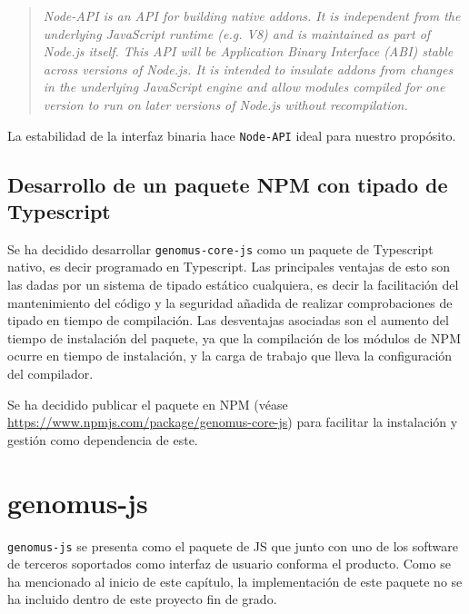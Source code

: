 \begin{quote} \textit{
    Node-API is an API for building native addons. It is independent from the underlying JavaScript runtime (e.g. V8) and is maintained as part of Node.js itself. This API will be Application Binary Interface (ABI) stable across versions of Node.js. It is intended to insulate addons from changes in the underlying JavaScript engine and allow modules compiled for one version to run on later versions of Node.js without recompilation.
}\end{quote}

La estabilidad de la interfaz binaria hace \verb|Node-API| ideal para nuestro propósito.
 
\subsection{Desarrollo de un paquete NPM con tipado de Typescript}

Se ha decidido desarrollar \verb|genomus-core-js| como un paquete de Typescript nativo, es decir programado en Typescript. Las principales ventajas de esto son las dadas por un sistema de tipado estático cualquiera, es decir la facilitación del mantenimiento del código y la seguridad añadida de realizar comprobaciones de tipado en tiempo de compilación. Las desventajas asociadas son el aumento del tiempo de instalación del paquete, ya que la compilación de los módulos de NPM ocurre en tiempo de instalación, y la carga de trabajo que lleva la configuración del compilador.

Se ha decidido publicar el paquete en NPM (véase \url{https://www.npmjs.com/package/genomus-core-js}) para facilitar la instalación y gestión como dependencia de este.

\section{genomus-js}

\verb|genomus-js| se presenta como el paquete de JS que junto con uno de los software de terceros soportados como interfaz de usuario conforma el producto. Como se ha mencionado al inicio de este capítulo, la implementación de este paquete no se ha incluido dentro de este proyecto fin de grado.